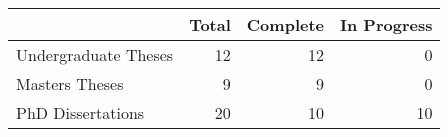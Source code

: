 \begin{tabular}{lrrr}
\toprule
 & Total & Complete & In Progress \\
\midrule
Undergraduate Theses & 12 & 12 & 0 \\
Masters Theses & 9 & 9 & 0 \\
PhD Dissertations & 20 & 10 & 10 \\
\bottomrule
\end{tabular}
